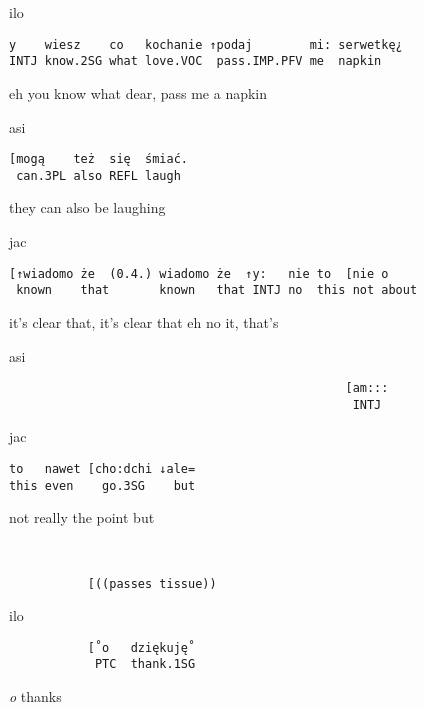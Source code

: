 \documentclass[output=paper]{langsci/langscibook}
\begin{document}
%
\begin{mdframednoverticalspace}[style=firstfoc]
\begin{transbox}{6}{ilo}
\begin{verbatim}
y    wiesz    co   kochanie ↑podaj        mi: serwetkę¿
INTJ know.2SG what love.VOC  pass.IMP.PFV me  napkin
\end{verbatim}
eh you know what dear, pass me a napkin
\end{transbox}
\end{mdframednoverticalspace}
%
\begin{transbox}{7}{asi}
\begin{verbatim}
[mogą    też  się  śmiać.
 can.3PL also REFL laugh
\end{verbatim}
\hspace{0.07cm} they can also be laughing
\end{transbox}
%
\begin{transbox}{8}{jac}
\begin{verbatim}
[↑wiadomo że  (0.4.) wiadomo że  ↑y:   nie to  [nie o
 known    that       known   that INTJ no  this not about
\end{verbatim}
\hspace{0.07cm} it’s clear that, it’s clear that eh no it, that’s
\end{transbox}
%
\begin{transbox}{9}{asi}
\begin{verbatim}
                                               [am:::
                                                INTJ
\end{verbatim}
\end{transbox}
%
\begin{transbox}{10}{jac}
\begin{verbatim}
to   nawet [cho:dchi ↓ale=
this even    go.3SG    but
\end{verbatim}
not really the point but
\end{transbox}
%
\begin{mdframednoverticalspace}[style=secondfoc]
\begin{transbox}{11}{~}
\begin{verbatim}
           [((passes tissue))
\end{verbatim}
\end{transbox}
\end{mdframednoverticalspace}\vspace{-2mm}
%
\begin{transbox}{12}{ilo}
\begin{verbatim}
           [˚o   dziękuję˚
            PTC  thank.1SG
\end{verbatim}
\hspace{1.8cm} \textit{o} thanks
\end{transbox}\bigskip
\end{document}
